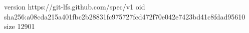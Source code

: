 version https://git-lfs.github.com/spec/v1
oid sha256:a08cda215a401fbc2b28831fc975727fcd472f70e042e7423bd41c8fdad95610
size 12901
